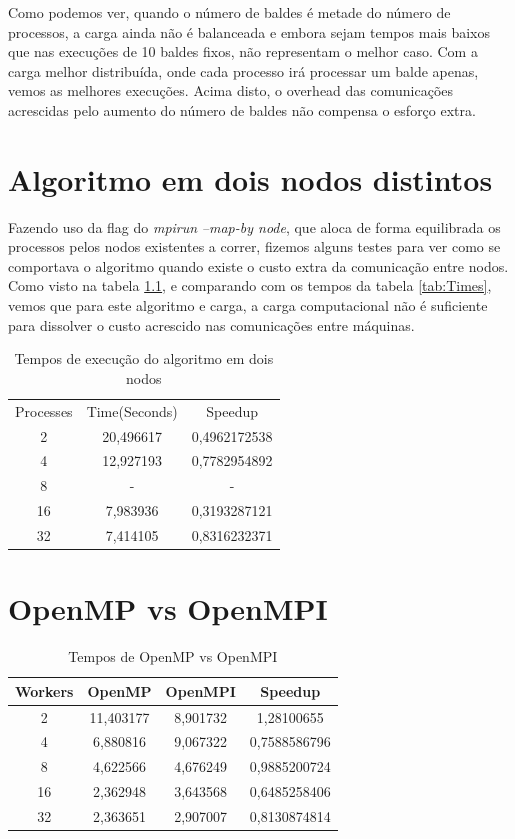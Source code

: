 \documentclass[a4paper]{report}
\begin{document}
Como podemos ver, quando o número de baldes é metade do número de processos, a
carga ainda não é balanceada e embora sejam tempos mais baixos que nas execuções
de 10 baldes fixos, não representam o melhor caso. Com a carga melhor
distribuída, onde cada processo irá processar um balde apenas, vemos as melhores
execuções. Acima disto, o overhead das comunicações acrescidas pelo aumento do
número de baldes não compensa o esforço extra.

\appendix

\chapter{Algoritmo em dois nodos distintos}

Fazendo uso da flag do \textit{mpirun} \textit{--map-by node}, que aloca de
forma equilibrada os processos pelos nodos existentes a correr, fizemos alguns
testes para ver como se comportava o algoritmo quando existe o custo extra da
comunicação entre nodos. Como visto na tabela \ref{tab:nodes}, e comparando com os tempos da
tabela \ref{tab:Times}, vemos que para este algoritmo e carga, a carga
computacional não é suficiente para dissolver o custo acrescido nas comunicações
entre máquinas.

\begin{table}[h]
    \centering
    \begin{tabular}{ccc}
        Processes & Time(Seconds) & Speedup      \\
        2         & 20,496617     & 0,4962172538 \\
        4         & 12,927193     & 0,7782954892 \\
        8         & -             & -            \\
        16        & 7,983936      & 0,3193287121 \\
        32        & 7,414105      & 0,8316232371
    \end{tabular}
    \caption{Tempos de execução do algoritmo em dois nodos}
    \label{tab:nodes}
\end{table}

\chapter{OpenMP vs OpenMPI}
\begin{table}[h]
    \centering
    \begin{tabular}{|c|c|c|c|}
        \hline
        Workers & OpenMP    & OpenMPI  & Speedup      \\ \hline
        2       & 11,403177 & 8,901732 & 1,28100655   \\ \hline
        4       & 6,880816  & 9,067322 & 0,7588586796 \\ \hline
        8       & 4,622566  & 4,676249 & 0,9885200724 \\ \hline
        16      & 2,362948  & 3,643568 & 0,6485258406 \\ \hline
        32      & 2,363651  & 2,907007 & 0,8130874814 \\ \hline
    \end{tabular}
    \caption{Tempos de OpenMP vs OpenMPI}
    \label{tab:ompi}
\end{table}
\end{document}
